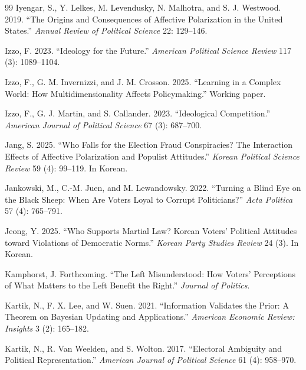 \documentclass[12pt,letterpaper]{article}
\begin{document}
\begin{thebibliography}{99}
Iyengar, S., Y. Lelkes, M. Levendusky, N. Malhotra, and S. J. Westwood. 2019. ``The Origins and Consequences of Affective Polarization in the United States.'' \textit{Annual Review of Political Science} 22: 129--146.

Izzo, F. 2023. ``Ideology for the Future.'' \textit{American Political Science Review} 117 (3): 1089--1104.

Izzo, F., G. M. Invernizzi, and J. M. Crosson. 2025. ``Learning in a Complex World: How Multidimensionality Affects Policymaking.'' Working paper.

Izzo, F., G. J. Martin, and S. Callander. 2023. ``Ideological Competition.'' \textit{American Journal of Political Science} 67 (3): 687--700.

Jang, S. 2025. ``Who Falls for the Election Fraud Conspiracies? The Interaction Effects of Affective Polarization and Populist Attitudes.'' \textit{Korean Political Science Review} 59 (4): 99--119. In Korean.

Jankowski, M., C.-M. Juen, and M. Lewandowsky. 2022. ``Turning a Blind Eye on the Black Sheep: When Are Voters Loyal to Corrupt Politicians?'' \textit{Acta Politica} 57 (4): 765--791.

Jeong, Y. 2025. ``Who Supports Martial Law? Korean Voters' Political Attitudes toward Violations of Democratic Norms.'' \textit{Korean Party Studies Review} 24 (3). In Korean.

Kamphorst, J. Forthcoming. ``The Left Misunderstood: How Voters' Perceptions of What Matters to the Left Benefit the Right.'' \textit{Journal of Politics}.

Kartik, N., F. X. Lee, and W. Suen. 2021. ``Information Validates the Prior: A Theorem on Bayesian Updating and Applications.'' \textit{American Economic Review: Insights} 3 (2): 165--182.

Kartik, N., R. Van Weelden, and S. Wolton. 2017. ``Electoral Ambiguity and Political Representation.'' \textit{American Journal of Political Science} 61 (4): 958--970.


\end{thebibliography}
\end{document}
